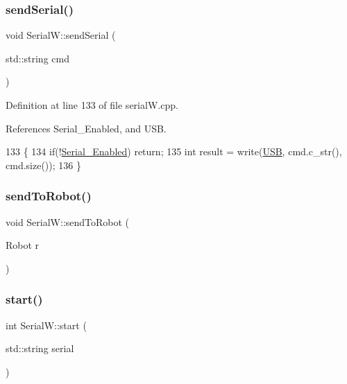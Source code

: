 \subsubsection{\texorpdfstring{send\+Serial()}{sendSerial()}}
{\footnotesize\ttfamily void Serial\+W\+::send\+Serial (\begin{DoxyParamCaption}\item[{std\+::string}]{cmd }\end{DoxyParamCaption})}



Definition at line 133 of file serial\+W.\+cpp.



References Serial\+\_\+\+Enabled, and U\+SB.


\begin{DoxyCode}
133                                       \{
134     \textcolor{keywordflow}{if}(!\hyperlink{class_serial_w_a557f72152ee772956c44fade26c1fd14}{Serial\_Enabled}) \textcolor{keywordflow}{return};
135     \textcolor{keywordtype}{int} result = write(\hyperlink{class_serial_w_addbc2cde514329294a30fd04da051ec8}{USB}, cmd.c\_str(), cmd.size());
136 \}
\end{DoxyCode}
\mbox{\label{class_serial_w_a05d1b44110f4f36bedace0ac729e09b6}} 
\subsubsection{\texorpdfstring{send\+To\+Robot()}{sendToRobot()}}
{\footnotesize\ttfamily void Serial\+W\+::send\+To\+Robot (\begin{DoxyParamCaption}\item[{Robot}]{r }\end{DoxyParamCaption})}

\mbox{\label{class_serial_w_a39a09737475182fe3588d3b78cae4bf3}} 
\subsubsection{\texorpdfstring{start()}{start()}}
{\footnotesize\ttfamily int Serial\+W\+::start (\begin{DoxyParamCaption}\item[{std\+::string}]{serial }\end{DoxyParamCaption})}



